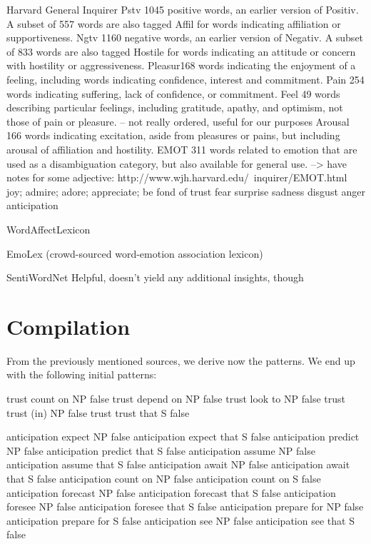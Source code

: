 Harvard General Inquirer
Pstv 1045 positive words, an earlier version of Positiv.
A subset of 557 words are also tagged Affil for words indicating affiliation or supportiveness.
Ngtv 1160 negative words, an earlier version of Negativ.
A subset of 833 words are also tagged Hostile for words indicating an attitude or concern with hostility or aggressiveness.
Pleasur168 words indicating the enjoyment of a feeling, including words indicating confidence, interest and commitment.
Pain 254 words indicating suffering, lack of confidence, or commitment.
Feel 49 words describing particular feelings, including gratitude, apathy, and optimism, not those of pain or pleasure.
-- not really ordered, useful for our purposes
Arousal 166 words indicating excitation, aside from pleasures or pains, but including arousal of affiliation and hostility.
EMOT 311 words related to emotion that are used as a disambiguation category, but also available for general use.
--> have notes for some adjective: http://www.wjh.harvard.edu/~inquirer/EMOT.html
joy; admire; adore; appreciate; be fond of
trust
fear
surprise
sadness
disgust
anger
anticipation

WordAffectLexicon



EmoLex (crowd-sourced word-emotion association lexicon)


SentiWordNet
Helpful, doesn't yield any additional insights, though

\section{Compilation}

From the previously mentioned sources, we derive now the patterns. We end up with the following initial patterns:

trust	count on	NP	false
trust	depend on	NP	false
trust	look to	NP	false
trust	trust (in)	NP	false
trust	trust that	S	false

anticipation	expect	NP	false
anticipation	expect that	S	false
anticipation	predict	NP	false
anticipation	predict that	S	false
anticipation	assume NP	false
anticipation	assume that	S	false
anticipation	await	NP	false
anticipation	await	that S	false
anticipation	count on	NP	false
anticipation	count on	S	false
anticipation	forecast	NP	false
anticipation	forecast that S	false
anticipation	foresee	NP	false
anticipation	foresee that	S	false
anticipation	prepare for	NP	false
anticipation	prepare for	S	false
anticipation	see	NP	false
anticipation	see that	S	false

